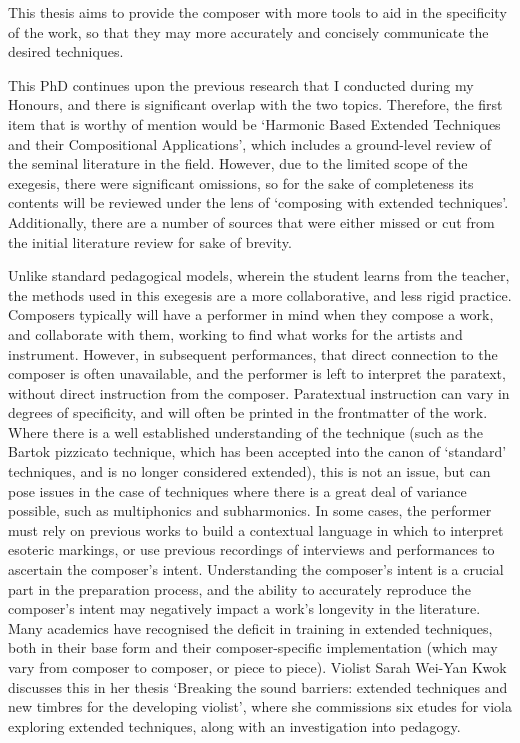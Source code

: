 This thesis aims to provide the composer with more tools to aid in the specificity of the work, so that they may more accurately and concisely communicate the desired techniques.

This PhD continues upon the previous research that I conducted during my Honours, and there is significant overlap with the two topics.
Therefore, the first item that is worthy of mention would be `Harmonic Based Extended Techniques and their Compositional Applications', which includes a ground-level review of the seminal literature in the field.\autocite{grayHarmonicBasedExtended2019}
However, due to the limited scope of the exegesis, there were significant omissions, so for the sake of completeness its contents will be reviewed under the lens of `composing with extended techniques'.
Additionally, there are a number of sources that were either missed or cut from the initial literature review for sake of brevity.

Unlike standard pedagogical models, wherein the student learns from the teacher, the methods used in this exegesis are a more collaborative, and less rigid practice.
Composers typically will have a performer in mind when they compose a work, and collaborate with them, working to find what works for the artists and instrument.
However, in subsequent performances, that direct connection to the composer is often unavailable, and the performer is left to interpret the paratext, without direct instruction from the composer.
Paratextual instruction can vary in degrees of specificity, and will often be printed in the frontmatter of the work.
Where there is a well established understanding of the technique (such as the Bartok pizzicato technique, which has been accepted into the canon of `standard' techniques, and is no longer considered extended), this is not an issue, but can pose issues in the case of techniques where there is a great deal of variance possible, such as multiphonics and subharmonics.
In some cases, the performer must rely on previous works to build a contextual language in which to interpret esoteric markings, or use previous recordings of interviews and performances to ascertain the composer's intent.
Understanding the composer's intent is a crucial part in the preparation process, and the ability to accurately reproduce the composer's intent may negatively impact a work's longevity in the literature.
Many academics have recognised the deficit in training in extended techniques, both in their base form and their composer-specific implementation (which may vary from composer to composer, or piece to piece). 
Violist Sarah Wei-Yan Kwok discusses this in her thesis `Breaking the sound barriers: extended techniques and new timbres for the developing violist', where she commissions six etudes for viola exploring extended techniques, along with an investigation into pedagogy.\autocite{kwokBreakingSoundBarriers2018}

